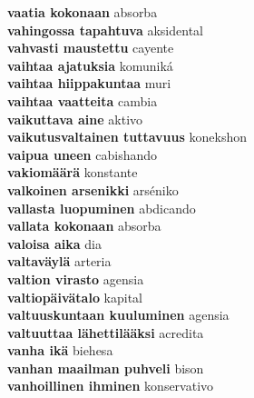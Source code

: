 \textbf{ vaatia kokonaan  } absorba \\
\textbf{ vahingossa tapahtuva  } aksidental \\
\textbf{ vahvasti maustettu  } cayente \\
\textbf{ vaihtaa ajatuksia  } komuniká \\
\textbf{ vaihtaa hiippakuntaa  } muri \\
\textbf{ vaihtaa vaatteita  } cambia \\
\textbf{ vaikuttava aine  } aktivo \\
\textbf{ vaikutusvaltainen tuttavuus  } konekshon \\
\textbf{ vaipua uneen  } cabishando \\
\textbf{ vakiomäärä  } konstante \\
\textbf{ valkoinen arsenikki  } arséniko \\
\textbf{ vallasta luopuminen  } abdicando \\
\textbf{ vallata kokonaan  } absorba \\
\textbf{ valoisa aika  } dia \\
\textbf{ valtaväylä  } arteria \\
\textbf{ valtion  virasto  } agensia \\
\textbf{ valtiopäivätalo  } kapital \\
\textbf{ valtuuskuntaan kuuluminen  } agensia \\
\textbf{ valtuuttaa lähettilääksi  } acredita \\
\textbf{ vanha ikä  } biehesa \\
\textbf{ vanhan  maailman  puhveli  } bison \\
\textbf{ vanhoillinen ihminen  } konservativo \\
